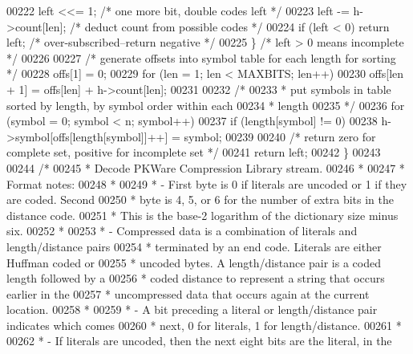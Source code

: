 \begin{DoxyCode}
00222         left <<= 1;                     \textcolor{comment}{/* one more bit, double codes left */}
00223         left -= h->count[len];          \textcolor{comment}{/* deduct count from possible codes */}
00224         \textcolor{keywordflow}{if} (left < 0) \textcolor{keywordflow}{return} left;      \textcolor{comment}{/* over-subscribed--return negative */}
00225     \}                                   \textcolor{comment}{/* left > 0 means incomplete */}
00226 
00227     \textcolor{comment}{/* generate offsets into symbol table for each length for sorting */}
00228     offs[1] = 0;
00229     \textcolor{keywordflow}{for} (len = 1; len < MAXBITS; len++)
00230         offs[len + 1] = offs[len] + h->count[len];
00231 
00232     \textcolor{comment}{/*}
00233 \textcolor{comment}{     * put symbols in table sorted by length, by symbol order within each}
00234 \textcolor{comment}{     * length}
00235 \textcolor{comment}{     */}
00236     for (symbol = 0; symbol < n; symbol++)
00237         \textcolor{keywordflow}{if} (length[symbol] != 0)
00238             h->symbol[offs[length[symbol]]++] = symbol;
00239 
00240     \textcolor{comment}{/* return zero for complete set, positive for incomplete set */}
00241     \textcolor{keywordflow}{return} left;
00242 \}
00243 
00244 \textcolor{comment}{/*}
00245 \textcolor{comment}{ * Decode PKWare Compression Library stream.}
00246 \textcolor{comment}{ *}
00247 \textcolor{comment}{ * Format notes:}
00248 \textcolor{comment}{ *}
00249 \textcolor{comment}{ * - First byte is 0 if literals are uncoded or 1 if they are coded.  Second}
00250 \textcolor{comment}{ *   byte is 4, 5, or 6 for the number of extra bits in the distance code.}
00251 \textcolor{comment}{ *   This is the base-2 logarithm of the dictionary size minus six.}
00252 \textcolor{comment}{ *}
00253 \textcolor{comment}{ * - Compressed data is a combination of literals and length/distance pairs}
00254 \textcolor{comment}{ *   terminated by an end code.  Literals are either Huffman coded or}
00255 \textcolor{comment}{ *   uncoded bytes.  A length/distance pair is a coded length followed by a}
00256 \textcolor{comment}{ *   coded distance to represent a string that occurs earlier in the}
00257 \textcolor{comment}{ *   uncompressed data that occurs again at the current location.}
00258 \textcolor{comment}{ *}
00259 \textcolor{comment}{ * - A bit preceding a literal or length/distance pair indicates which comes}
00260 \textcolor{comment}{ *   next, 0 for literals, 1 for length/distance.}
00261 \textcolor{comment}{ *}
00262 \textcolor{comment}{ * - If literals are uncoded, then the next eight bits are the literal, in the}

\end{DoxyCode}
